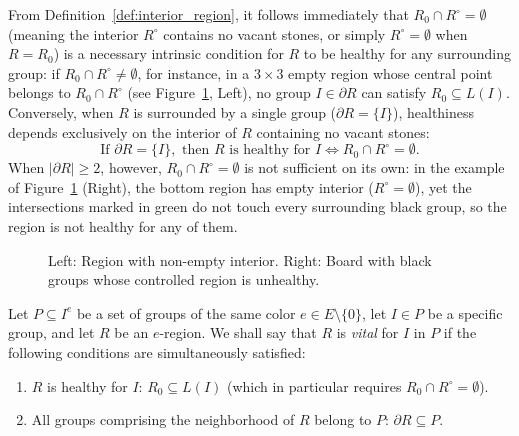 From Definition~\ref{def:interior_region}, it follows immediately that $R_0 \cap R^\circ = \emptyset$ (meaning the interior $R^\circ$ contains no vacant stones, or simply $R^\circ = \emptyset$ when $R = R_0$) is a necessary intrinsic condition for $R$ to be healthy for any surrounding group: if $R_0 \cap R^\circ \neq \emptyset$, for instance, in a $3 \times 3$ empty region whose central point belongs to $R_0 \cap R^\circ$ (see Figure~\ref{fig:benson_ej_2}, Left), no group $I \in \partial R$ can satisfy $R_0 \subseteq L(I)$. Conversely, when $R$ is surrounded by a single group ($\partial R = \{I\}$), healthiness depends exclusively on the interior of $R$ containing no vacant stones:
\[
\text{If } \partial R = \{I\}, \text{ then } R \text{ is healthy for } I \iff R_0 \cap R^\circ = \emptyset.
\]
When $|\partial R| \ge 2$, however, $R_0 \cap R^\circ = \emptyset$ is not sufficient on its own: in the example of Figure~\ref{fig:benson_ej_2} (Right), the bottom region has empty interior ($R^\circ = \emptyset$), yet the intersections marked in \textcolor{Moss}{green} do not touch every surrounding black group, so the region is not healthy for any of them.

\begin{figure}[H]
	\vspace{15pt}
	\centering
	\begin{goban}[hoshi=false]
	\end{goban}
	\begin{goban}[hoshi=false]
	\end{goban}
	\caption{Left: Region with non-empty \textcolor{bg}{interior}. Right: Board with black groups whose controlled region is \textcolor{Moss}{unhealthy}.}
	\label{fig:benson_ej_2}
\end{figure}

\begin{definition}\label{def:reg_vital}
	Let $P \subseteq I^e$ be a set of groups of the same color $e \in E \setminus \{0\}$, let $I \in P$ be a specific group, and let $R$ be an $e$-region. We shall say that $R$ is \emph{vital} for $I$ in $P$ if the following conditions are simultaneously satisfied:
	\begin{enumerate}
		\item $R$ is healthy for $I$: $R_0 \subseteq L(I)$ (which in particular requires $R_0 \cap R^\circ = \emptyset$).
		\item All groups comprising the neighborhood of $R$ belong to $P$: $\partial R \subseteq P$.
	\end{enumerate}
\end{definition}

